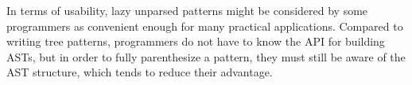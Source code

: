 \documentclass{sigplanconf}
\begin{document}


In terms of usability, lazy unparsed patterns might be considered by
some programmers as convenient enough for many practical
applications. Compared to writing tree patterns, programmers do not
have to know the API for building ASTs, but in order to fully
parenthesize a pattern, they must still be aware of the AST structure,
which tends to reduce their advantage.
\end{document}
